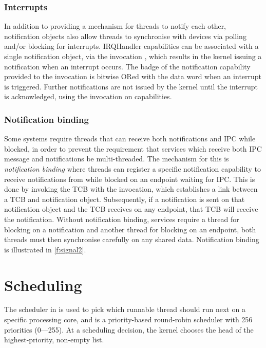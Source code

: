 \subsubsection{Interrupts}

In addition to providing a mechanism for threads to notify each other, notification objects 
also allow threads to synchronise with devices via polling and/or blocking for interrupts. 
IRQHandler capabilities can be associated with a single notification object, via the invocation
, which results in the kernel issuing a notification when an interrupt
occurs. The badge of the notification capability provided to the invocation is bitwise ORed with the
data word when an interrupt is triggered. Further notifications are not issued by the kernel
until the interrupt is acknowledged, using the  invocation on
 capabilities.

\subsubsection{Notification binding}
\label{s:notification-binding}

Some systems require threads that can receive both notifications and IPC while blocked, in order to
prevent the requirement that services which receive both IPC message and notifications be
multi-threaded.  The mechanism for this is \emph{notification binding} where threads can register a
specific notification capability to receive notifications from while blocked on an endpoint waiting
for IPC. This is done by invoking the TCB with the \tcbbindnotification invocation, which
establishes a link between a TCB and notification object. Subsequently, if a notification is sent on
that notification object and the TCB receives on any endpoint, that TCB will receive the
notification.  Without notification binding, services require a thread for blocking on a
notification and another thread for blocking on an endpoint, both threads must then synchronise
carefully on any shared data.
Notification binding is illustrated in
\cref{f:signal2}.


\section{Scheduling}

The scheduler in \selfour is used to pick which runnable thread should run next on a specific
processing core, and is a priority-based round-robin scheduler with 256 priorities (0---255). 
At a scheduling decision, the kernel chooses the head of the highest-priority, non-empty list.

